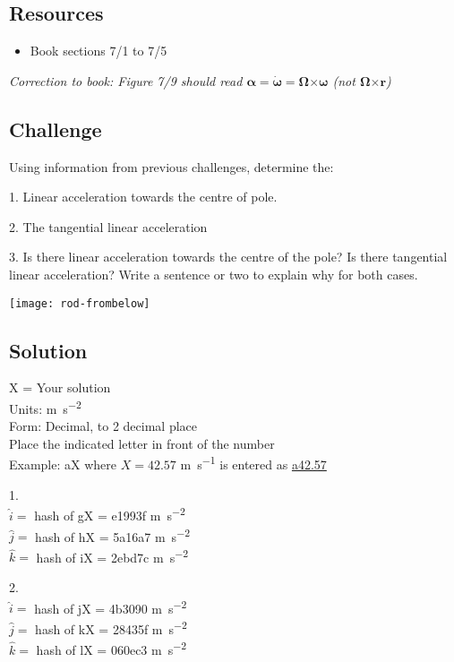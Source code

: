 \subsection*{Resources}
\begin{itemize}
    \item Book sections 7/1 to 7/5
\end{itemize}

\emph{Correction to book: Figure 7/9 should read $\bm{\alpha} = \bm{\dot{\omega}} = \bm{\Omega} \bm{\times} \bm{\omega}$ (not $\bm{\Omega} \bm{\times} \bm{r}$)}

\subsection*{Challenge}
Using information from previous challenges, determine the:

1. Linear acceleration towards the centre of pole.

2. The tangential linear acceleration

3. Is there linear acceleration towards the centre of the pole? Is there tangential linear acceleration? Write a sentence or two to explain why for both cases.

\texttt{[image: rod-frombelow]}


\subsection*{Solution}
X = Your solution\\
Units: \si{\meter\per\square\second}\\
Form: Decimal, to 2 decimal place\\
Place the indicated letter in front of the number\\
Example: aX where $X=42.57$ \si{\meter\per\second} is entered as \href{http://www.wolframalpha.com/input/?i=md5+hash+of+\%22a42.5\%22}{a42.57}

1.\\
$\hat{i}=$ hash of gX = e1993f \si{\meter\per\square\second}\\
$\hat{j}=$ hash of hX = 5a16a7 \si{\meter\per\square\second}\\
$\hat{k}=$ hash of iX = 2ebd7c \si{\meter\per\square\second}

2.\\
$\hat{i}=$ hash of jX = 4b3090 \si{\meter\per\square\second}\\
$\hat{j}=$ hash of kX = 28435f \si{\meter\per\square\second}\\
$\hat{k}=$ hash of lX = 060ec3 \si{\meter\per\square\second}


